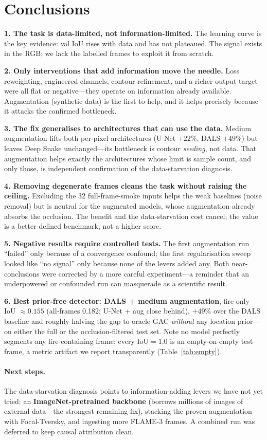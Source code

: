 \documentclass[10pt]{article}
\begin{document}
\section{Conclusions}

\textbf{1. The task is data-limited, not information-limited.} The learning curve
is the key evidence: val IoU rises with data and has not plateaued. The signal
exists in the RGB; we lack the labelled frames to exploit it from scratch.

\textbf{2. Only interventions that add information move the needle.} Loss
reweighting, engineered channels, contour refinement, and a richer output target
were all flat or negative---they operate on information already available.
Augmentation (synthetic data) is the first to help, and it helps precisely
because it attacks the confirmed bottleneck.

\textbf{3. The fix generalises to architectures that can use the data.}
Medium augmentation lifts both per-pixel architectures (U-Net $+22\%$, DALS
$+49\%$) but leaves Deep Snake unchanged---its bottleneck is contour
\emph{seeding}, not data. That augmentation helps exactly the architectures whose
limit is sample count, and only those, is independent confirmation of the
data-starvation diagnosis.

\textbf{4. Removing degenerate frames cleans the task without raising the
ceiling.} Excluding the 32 full-frame-smoke inputs helps the weak baselines
(noise removal) but is neutral for the augmented models, whose augmentation
already absorbs the occlusion. The benefit and the data-starvation cost cancel;
the value is a better-defined benchmark, not a higher score.

\textbf{5. Negative results require controlled tests.} The first augmentation run
``failed'' only because of a convergence confound; the first regularisation
sweep looked like ``no signal'' only because none of the levers added any. Both
near-conclusions were corrected by a more careful experiment---a reminder that an
underpowered or confounded run can masquerade as a scientific result.

\textbf{6. Best prior-free detector: DALS + medium augmentation}, fire-only IoU
$\approx0.155$ (all-frames 0.182; U-Net + aug close behind), $+49\%$ over the DALS
baseline and roughly halving the gap to oracle-GAC \emph{without} any location
prior---on either the full or the occlusion-filtered test set. Note no model
perfectly segments any fire-containing frame; every IoU$=1.0$ is an empty-on-empty
test frame, a metric artifact we report transparently (Table~\ref{tab:empty}).

\paragraph{Next steps.} The data-starvation diagnosis points to information-adding
levers we have not yet tried: an \textbf{ImageNet-pretrained backbone} (borrows
millions of images of external data---the strongest remaining fix), stacking the
proven augmentation with Focal-Tversky, and ingesting more FLAME-3 frames. A
combined run was deferred to keep causal attribution clean.
\end{document}
